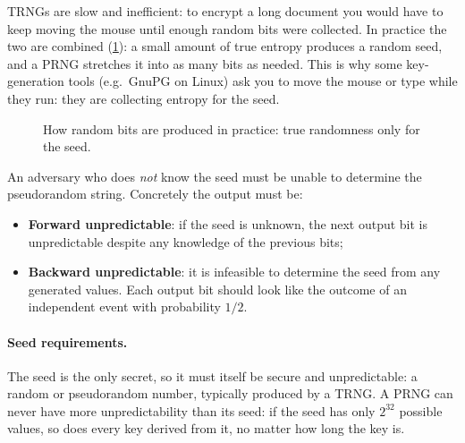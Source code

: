 TRNGs are slow and inefficient: to encrypt a long document you would have to keep moving the mouse until enough random bits were collected. In practice the two are combined (\cref{fig:rng-pipeline}): a small amount of true entropy produces a random seed, and a PRNG stretches it into as many bits as needed. This is why some key-generation tools (e.g.\ GnuPG on Linux) ask you to move the mouse or type while they run: they are collecting entropy for the seed.

\begin{figure}[H]
\centering
{}
\caption{How random bits are produced in practice: true randomness only for the seed.}
\label{fig:rng-pipeline}
\end{figure}

\begin{definition}
An adversary who does \emph{not} know the seed must be unable to determine the pseudorandom string. Concretely the output must be:
\begin{itemize}
    \item \textbf{Forward unpredictable}: if the seed is unknown, the next output bit is unpredictable despite any knowledge of the previous bits;
    \item \textbf{Backward unpredictable}: it is infeasible to determine the seed from any generated values. Each output bit should look like the outcome of an independent event with probability $1/2$.
\end{itemize}
\end{definition}

\paragraph{Seed requirements.} The seed is the only secret, so it must itself be secure and unpredictable: a random or pseudorandom number, typically produced by a TRNG. A PRNG can never have more unpredictability than its seed: if the seed has only $2^{32}$ possible values, so does every key derived from it, no matter how long the key is.


